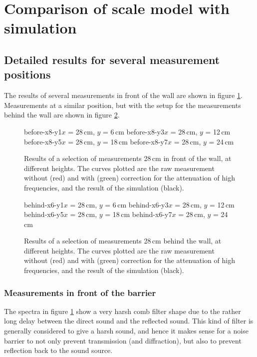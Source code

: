 \section{Comparison of scale model with simulation \label{sectComparison}}

\subsection{Detailed results for several measurement positions}
The results of several measurements in front of the wall are shown in figure \ref{beforePlots}. Measurements at a similar position, but with the setup for the measurements behind the wall are shown in figure \ref{behindPlots}.


\begin{figure}
\figOctaveTwoNoFigNoCaption{-0.0cm}
	{before-x8-y1}{$x$ = 28\,cm, $y$ = 6\,cm}
	{before-x8-y3}{$x$ = 28\,cm, $y$ = 12\,cm}
\figOctaveTwoNoFigNoCaption{-0.0cm}
	{before-x8-y5}{$x$ = 28\,cm, $y$ = 18\,cm}
	{before-x8-y7}{$x$ = 28\,cm, $y$ = 24\,cm}
\caption{Results of a selection of measurements 28\,cm in front of the wall, at different heights. The curves plotted are the raw measurement without (red) and with (green) correction for the attenuation of high frequencies, and the result of the simulation (black). \label{beforePlots}}
\end{figure}

\begin{figure}
\figOctaveTwoNoFigNoCaption{-0.0cm}
	{behind-x6-y1}{$x$ = 28\,cm, $y$ = 6\,cm}
	{behind-x6-y3}{$x$ = 28\,cm, $y$ = 12\,cm}
\figOctaveTwoNoFigNoCaption{-0.0cm}
	{behind-x6-y5}{$x$ = 28\,cm, $y$ = 18\,cm}
	{behind-x6-y7}{$x$ = 28\,cm, $y$ = 24\,cm}
\caption{Results of a selection of measurements 28\,cm behind the wall, at different heights. The curves plotted are the raw measurement without (red) and with (green) correction for the attenuation of high frequencies, and the result of the simulation (black). \label{behindPlots}}
\end{figure}


\subsubsection*{Measurements in front of the barrier}

The spectra in figure \ref{beforePlots} show a very harsh comb filter shape due to the rather long delay between the direct sound and the reflected sound. This kind of filter is generally considered to give a harsh sound, and hence it makes sense for a noise barrier to not only prevent transmission (and diffraction), but also to prevent reflection back to the sound source.


